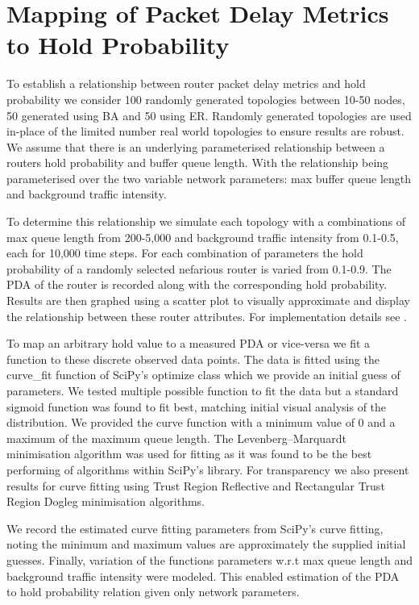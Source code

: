 \section{Mapping of Packet Delay Metrics to Hold Probability}
\label{sec:APDAtoHoldprob}
 To establish a relationship between router packet delay metrics and hold probability we  consider 100 randomly generated topologies between 10-50 nodes, 50 generated using BA and 50 using ER. Randomly generated topologies are used in-place of the limited number real world topologies to ensure results are robust. We assume that there is an underlying parameterised relationship between a routers hold probability and buffer queue length. With the relationship being parameterised over the two variable network parameters: max buffer queue length and background traffic intensity.\par
  To determine this relationship we simulate each topology with a combinations of max queue length from  200-5,000 and background traffic intensity from 0.1-0.5, each for 10,000 time steps. For each combination of parameters the hold probability of a randomly selected nefarious router is varied from 0.1-0.9. The PDA of the router is recorded along with the corresponding hold probability. Results are then graphed using a scatter plot to visually approximate and display the relationship between these router attributes. For implementation details see \cite{sylvester_millar_real_2021}.\par
  To map an arbitrary hold value to a measured PDA or vice-versa we fit a function to these discrete observed data points. The data is fitted using the curve\_fit function of SciPy's optimize class which we provide an initial guess of parameters. We tested multiple possible function to fit the data but a standard sigmoid function was found to fit best, matching initial visual analysis of the distribution. We provided the curve function with a minimum value of 0 and a maximum of the maximum queue length. The Levenberg–Marquardt minimisation algorithm was used for fitting as it was found to be the best performing of algorithms within SciPy's library. For transparency we also present results for curve fitting using Trust Region Reflective and Rectangular Trust Region Dogleg minimisation algorithms.\par
  We record the estimated curve fitting parameters from SciPy's curve fitting, noting the minimum and maximum values are approximately the supplied initial guesses. Finally, variation of the functions parameters w.r.t max queue length and background traffic intensity were modeled. This enabled estimation of the PDA to hold probability relation given only network parameters.\par
